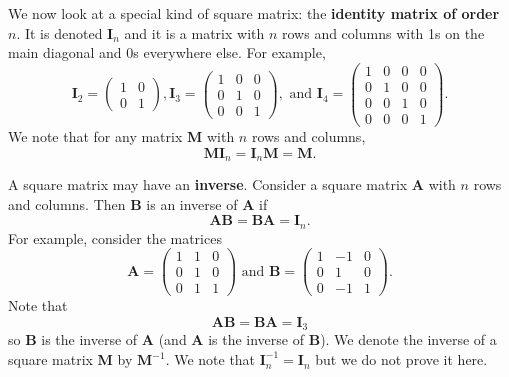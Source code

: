 We now look at a special kind of square matrix: the \textbf{identity matrix of order $n$}. It is denoted $\textbf{I}_n$ and it is a matrix with $n$ rows and columns with 1s on the main diagonal and 0s everywhere else. For example,
\[
    \textbf{I}_2 = \begin{pmatrix}1 & 0\\0 & 1\end{pmatrix},
\textbf{I}_3 = \begin{pmatrix}1 & 0 & 0\\0 & 1 & 0\\0 & 0 & 1\end{pmatrix}, \text{ and }
\textbf{I}_4 = \begin{pmatrix}1 & 0 & 0 & 0\\0 & 1 & 0 & 0\\0 & 0 & 1 & 0\\0 & 0 & 0 & 1\end{pmatrix}.
\]
We note that for any matrix \textbf{M} with $n$ rows and columns,
\[
    \textbf{MI}_n = \textbf{I}_n\textbf{M} = \textbf{M}.
\]

A square matrix may have an \textbf{inverse}. Consider a square matrix \textbf{A} with $n$ rows and columns. Then \textbf{B} is an inverse of \textbf{A} if
\[
    \textbf{AB} = \textbf{BA} = \textbf{I}_n.
\]
For example, consider the matrices
\[
    \textbf{A} = \begin{pmatrix}1&1&0\\ 0&1&0\\ 0&1&1\end{pmatrix} \text{ and } \textbf{B} = \begin{pmatrix}1&-1&0\\0&1&0\\0&-1&1\end{pmatrix}.
\]
Note that
\[
    \textbf{AB} = \textbf{BA} = \textbf{I}_3
\]
so \textbf{B} is the inverse of \textbf{A} (and \textbf{A} is the inverse of \textbf{B}). We denote the inverse of a square matrix \textbf{M} by $\textbf{M}^{-1}$. We note that $\textbf{I}_n^{-1} = \textbf{I}_n$ but we do not prove it here.

